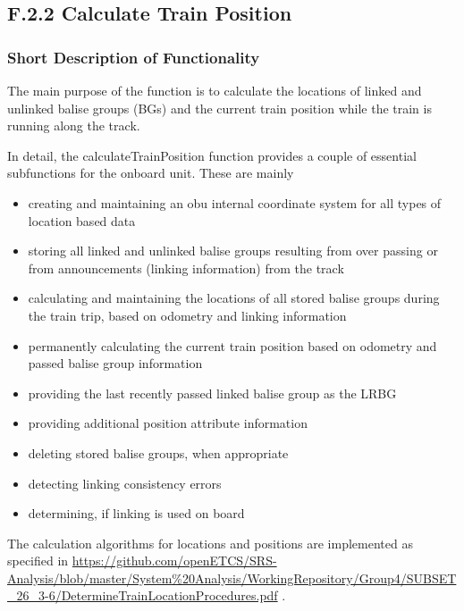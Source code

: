 
\subsection{F.2.2 Calculate Train Position}\label{sss:calctrainpos}

\subsubsection{Short Description of Functionality}
The main purpose of the function is to calculate the locations of linked and unlinked balise groups (BGs) and the current train position while the train is running along the track. 

In detail, the calculateTrainPosition function provides a couple of essential subfunctions for the onboard unit. These are mainly
\begin{itemize}
\item creating and maintaining an obu internal coordinate system for all types of location based data
\item storing all linked and unlinked balise groups resulting from over passing or from announcements (linking information) from the track
\item calculating and maintaining the locations of all stored balise groups during the train trip, based on odometry and linking information
\item permanently calculating the current train position based on odometry and passed balise group information
\item providing the last recently passed linked balise group as the LRBG
\item providing additional position attribute information
\item deleting stored balise groups, when appropriate
\item detecting linking consistency errors
\item determining, if linking is used on board
\end{itemize}


The calculation algorithms for locations and positions are implemented as specified in 
\url{https://github.com/openETCS/SRS-Analysis/blob/master/System%20Analysis/WorkingRepository/Group4/SUBSET_26_3-6/DetermineTrainLocationProcedures.pdf} .

